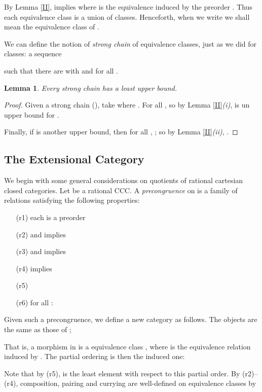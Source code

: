 \documentclass[11pt]{article}
\newtheorem{lemma}[theorem]{Lemma}
\begin{document}
By Lemma \ref{II},  implies  where
 is the equivalence induced by the preorder . Thus each
equivalence class is a union of
classes. Henceforth, when we write  we shall mean
the equivalence class of .

We can define the notion of {\em strong chain} of equivalence
classes, just as we did for classes:
a sequence

such that there are  with
 and  for
all .

\begin{lemma}\label{Strong}
Every strong chain has a least upper bound.
\end{lemma}
\begin{proof} Given a strong chain (\dag), take
 where
. For all , so by Lemma
\ref{II}{\it(i)},  is un upper bound for
.

Finally, if  is another upper bound, then for all ,
; so by Lemma \ref{II}{\it (ii)},
.
\end{proof}


\subsection{The Extensional Category }

We begin with some general considerations on quotients of rational cartesian
closed categories. Let  be a rational CCC. A {\em precongruence}
on  is a family
 of
relations  satisfying
the following properties:
\begin{itemize}
\item[(r1)] each  is a preorder
\item[(r2)]  and  implies

\item[(r3)]  and  implies

\item[(r4)]  implies 
\item[(r5)] 
\item[(r6)] for all :

\end{itemize}

Given such a precongruence, we define a new category  as
follows. The objects are the same as those of ;

That is, a morphism in 
is a equivalence class , where  is the
equivalence relation induced by . The partial ordering is then
the induced one:

Note that by (r5),  is the least element with respect to this
partial order. By (r2)--(r4), composition, pairing and currying are well-defined
on equivalence classes by
\end{document}
